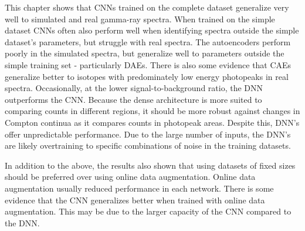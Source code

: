 This chapter shows that CNNs trained on the complete dataset generalize very well to simulated and real gamma-ray spectra. When trained on the simple dataset CNNs often also perform well when identifying spectra outside the simple dataset's parameters, but struggle with real spectra. The autoencoders perform poorly in the simulated spectra, but generalize well to parameters outside the simple training set - particularly DAEs. There is also some evidence that CAEs generalize better to isotopes with predominately low energy photopeaks in real spectra. Occasionally, at the lower signal-to-background ratio, the DNN outperforms the CNN. Because the dense architecture is more suited to comparing counts in different regions, it should be more robust against changes in Compton continua as it compares counts in photopeak areas. Despite this, DNN's offer unpredictable performance. Due to the large number of inputs, the DNN's are likely overtraining to specific combinations of noise in the training datasets.

In addition to the above, the results also shown that using datasets of fixed sizes should be preferred over using online data augmentation. Online data augmentation usually reduced performance in each network. There is some evidence that the CNN generalizes better when trained with online data augmentation. This may be due to the larger capacity of the CNN compared to the DNN. 





